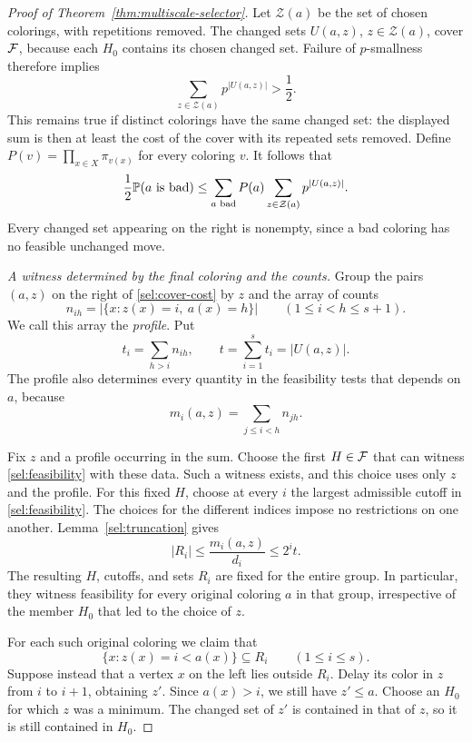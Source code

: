 \begin{proof}[Proof of Theorem~\ref{thm:multiscale-selector}]
Let $\mathcal Z(a)$ be the set of chosen colorings, with repetitions
removed.  The changed sets $U(a,z)$, $z\in\mathcal Z(a)$, cover
$\F$, because each $H_0$ contains its chosen changed set.  Failure of
$p$-smallness therefore implies
\[
  \sum_{z\in\mathcal Z(a)}p^{|U(a,z)|}>\frac12.
\]
This remains true if distinct colorings have the same changed set:
the displayed sum is then at least the cost of the cover with its
repeated sets removed.  Define
$P(v)=\prod_{x\in X}\pi_{v(x)}$ for every coloring $v$.  It follows
that
\begin{equation}
\label{sel:cover-cost}
  \frac12\P(a\text{ is bad})
  \le
  \sum_{a\text{ bad}}P(a)
       \sum_{z\in\mathcal Z(a)}p^{|U(a,z)|}.
\end{equation}
Every changed set appearing on the right is nonempty, since a bad
coloring has no feasible unchanged move.

\medskip
\noindent\textit{A witness determined by the final coloring and the counts.}
Group the pairs $(a,z)$ on the right of \eqref{sel:cover-cost} by
$z$ and the array of counts
\[
  n_{ih}=|\{x:z(x)=i,\ a(x)=h\}|
  \qquad(1\le i<h\le s+1).
\]
We call this array the \emph{profile}.  Put
\[
  t_i=\sum_{h>i}n_{ih},
  \qquad t=\sum_{i=1}^s t_i=|U(a,z)|.
\]
The profile also determines every quantity in the feasibility tests
that depends on $a$, because
\begin{equation}
\label{sel:profile-crossings}
  m_i(a,z)=\sum_{j\le i<h}n_{jh}.
\end{equation}

Fix $z$ and a profile occurring in the sum.  Choose the first
$H\in\F$ that can witness \eqref{sel:feasibility} with these data.
Such a witness exists, and this choice uses only $z$ and the
profile.  For this fixed $H$, choose at every $i$ the largest
admissible cutoff in \eqref{sel:feasibility}.  The choices for the
different indices impose no restrictions on one another.
Lemma~\ref{sel:truncation} gives
\begin{equation}
\label{sel:large-weight-bound}
  |R_i|\le \frac{m_i(a,z)}{d_i}\le 2^i t.
\end{equation}
The resulting $H$, cutoffs, and sets $R_i$ are fixed for the entire
group.  In particular, they witness feasibility for every original
coloring $a$ in that group, irrespective of the member $H_0$ that
led to the choice of $z$.

For each such original coloring we claim that
\begin{equation}
\label{sel:changed-vertices}
  \{x:z(x)=i<a(x)\}\subseteq R_i
  \qquad(1\le i\le s).
\end{equation}
Suppose instead that a vertex $x$ on the left lies outside $R_i$.
Delay its color in $z$ from $i$ to $i+1$, obtaining $z'$.
Since $a(x)>i$, we still have $z'\le a$.  Choose an $H_0$ for which
$z$ was a minimum.  The changed set of $z'$ is contained in that of
$z$, so it is still contained in $H_0$.


\end{proof}
